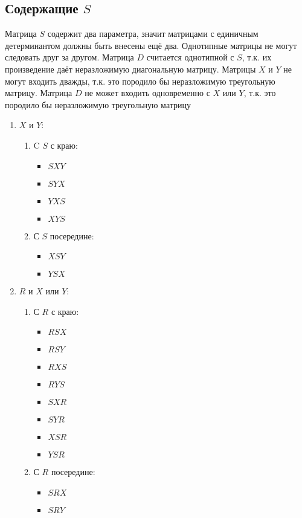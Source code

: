 \subsection{Содержащие $S$}

Матрица $S$ содержит два параметра, значит матрицами с единичным детерминантом должны быть внесены ещё два.
Однотипные матрицы не могут следовать друг за другом.
Матрица $D$ считается однотипной с $S$, т.к. их произведение даёт неразложимую диагональную матрицу.
Матрицы $X$ и $Y$ не могут входить дважды, т.к. это породило бы неразложимую треугольную матрицу.
Матрица $D$ не может входить одновременно с $X$ или $Y$, т.к. это породило бы неразложимую треугольную матрицу

\begin{enumerate}
	\item $X$ и $Y$:
	\begin{enumerate}
		\item C $S$ с краю:
		\begin{itemize}
			\item $SXY$
			\item $SYX$
			\item $YXS$
			\item $XYS$
		\end{itemize}
		\item С $S$ посередине:
		\begin{itemize}
			\item $XSY$
			\item $YSX$
		\end{itemize}
	\end{enumerate}
	\item $R$ и $X$ или $Y$:
	\begin{enumerate}
		\item С $R$ с краю:
		\begin{itemize}
			\item $RSX$
			\item $RSY$
			\item $RXS$
			\item $RYS$
			\item $SXR$
			\item $SYR$
			\item $XSR$
			\item $YSR$
		\end{itemize}
		\item С $R$ посередине:
		\begin{itemize}
			\item $SRX$
			\item $SRY$

\end{itemize}
\end{enumerate}
\end{enumerate}
